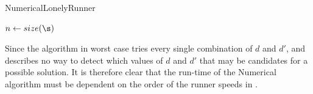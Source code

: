 \begin{algorithm}[H]
  \caption{NumericalLonelyRunner}
  \highlights
  
  $n \gets size(\s)$

  \return \no
\end{algorithm}

Since the algorithm in worst case tries every single combination of
$d$ and $d\prime$, and \cite{invis} describes no way to detect which
values of $d$ and $d\prime$ that may be candidates for a possible
solution. It is therefore clear that the run-time of the Numerical
algorithm must be dependent on the order of the runner speeds in \comS.

